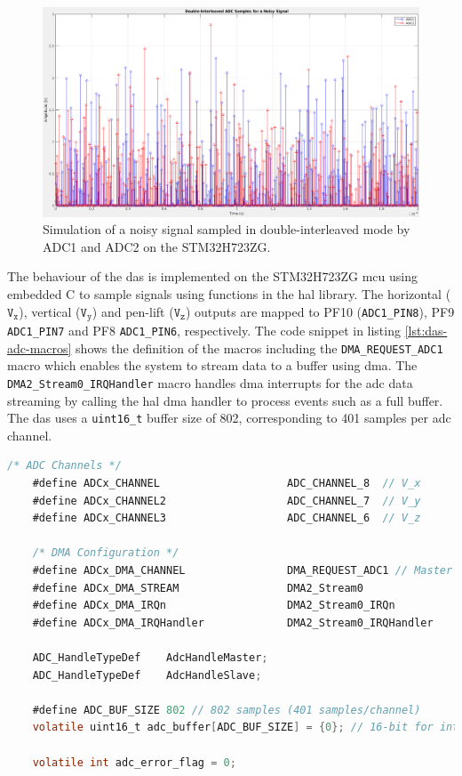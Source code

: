 \documentclass[class=report,11pt,crop=false]{standalone}
\begin{document}
	\begin{figure}[h!]
		\centering
		\includegraphics[width=0.70\linewidth]{Figures/Methodology/das-adc-sim-noisy}
		\caption{Simulation of a noisy signal sampled in double-interleaved mode by ADC1 and ADC2 on the STM32H723ZG.}
		\label{fig:das-adc-sim-noisy}
	\end{figure} 

	The behaviour of the \acrshort{das} is implemented on the STM32H723ZG \acrshort{mcu} using embedded C to sample signals using functions in the \acrfull{hal} library. The horizontal ($\texttt{V}_\texttt{x}$), vertical ($\texttt{V}_\texttt{y}$) and pen-lift ($\texttt{V}_\texttt{z}$) outputs are mapped to PF10 (\texttt{ADC1\_PIN8}), PF9 \texttt{ADC1\_PIN7} and PF8 \texttt{ADC1\_PIN6}, respectively. The code snippet in listing \ref{lst:das-adc-macros} shows the definition of the macros including the \texttt{DMA\_REQUEST\_ADC1} macro which enables the system to stream data to a buffer using \acrshort{dma}. The \texttt{DMA2\_Stream0\_IRQHandler} macro handles \acrshort{dma} interrupts for the \acrshort{adc} data streaming by calling the \acrshort{hal} \acrshort{dma} handler to process events such as a full buffer. The \acrshort{das} uses a \texttt{uint16\_t} buffer size of 802, corresponding to 401 samples per \acrshort{adc} channel. 
	
	\begin{lstlisting}[language=C, label={lst:das-adc-macros}, caption={Showing macros for the \acrshort{adc} channels, \acrshort{dma} and the associated interrupts for handling streaming.}]
	/* ADC Channels */
	#define ADCx_CHANNEL                    ADC_CHANNEL_8  // V_x
	#define ADCx_CHANNEL2                   ADC_CHANNEL_7  // V_y
	#define ADCx_CHANNEL3                   ADC_CHANNEL_6  // V_z
	
	/* DMA Configuration */
	#define ADCx_DMA_CHANNEL                DMA_REQUEST_ADC1 // Master ADC1
	#define ADCx_DMA_STREAM                 DMA2_Stream0
	#define ADCx_DMA_IRQn                   DMA2_Stream0_IRQn
	#define ADCx_DMA_IRQHandler             DMA2_Stream0_IRQHandler
	
	ADC_HandleTypeDef    AdcHandleMaster;
	ADC_HandleTypeDef    AdcHandleSlave;
	
	#define ADC_BUF_SIZE 802 // 802 samples (401 samples/channel)
	volatile uint16_t adc_buffer[ADC_BUF_SIZE] = {0}; // 16-bit for interleaved data
	
	volatile int adc_error_flag = 0;
	\end{lstlisting}
\end{document}

